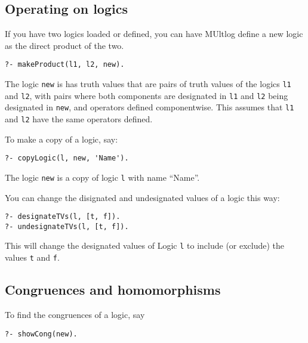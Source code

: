 \documentclass[
]{article}
\newcommand{\passthrough}[1]{#1}
\begin{document}
\hypertarget{operating-on-logics}{%
\subsection{Operating on logics}\label{operating-on-logics}}

If you have two logics loaded or defined, you can have MUltlog define a
new logic as the direct product of the two.

\begin{lstlisting}
?- makeProduct(l1, l2, new).
\end{lstlisting}

The logic \passthrough{\lstinline!new!} is has truth values that are
pairs of truth values of the logics \passthrough{\lstinline!l1!} and
\passthrough{\lstinline!l2!}, with pairs where both components are
designated in \passthrough{\lstinline!l1!} and
\passthrough{\lstinline!l2!} being designated in
\passthrough{\lstinline!new!}, and operators defined componentwise. This
assumes that \passthrough{\lstinline!l1!} and
\passthrough{\lstinline!l2!} have the same operators defined.

To make a copy of a logic, say:

\begin{lstlisting}
?- copyLogic(l, new, 'Name').
\end{lstlisting}

The logic \passthrough{\lstinline!new!} is a copy of logic
\passthrough{\lstinline!l!} with name ``Name''.

You can change the disignated and undesignated values of a logic this
way:

\begin{lstlisting}
?- designateTVs(l, [t, f]).
?- undesignateTVs(l, [t, f]).
\end{lstlisting}

This will change the designated values of Logic
\passthrough{\lstinline!l!} to include (or exclude) the values
\passthrough{\lstinline!t!} and \passthrough{\lstinline!f!}.

\hypertarget{congruences-and-homomorphisms}{%
\subsection{Congruences and
homomorphisms}\label{congruences-and-homomorphisms}}

To find the congruences of a logic, say

\begin{lstlisting}
?- showCong(new).
\end{lstlisting}
\end{document}
